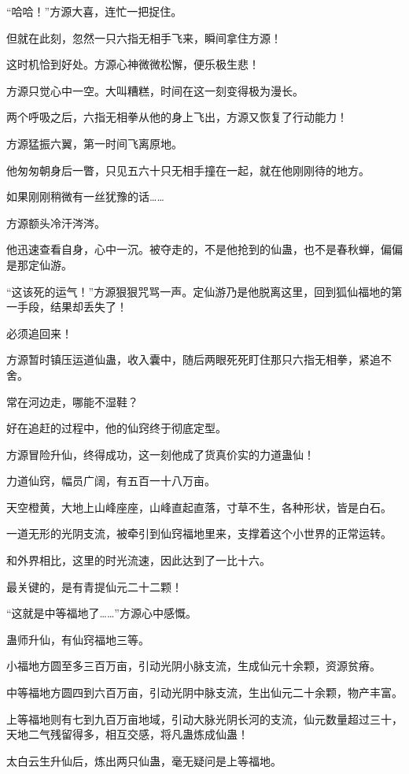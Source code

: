 \begin{this_body}
“哈哈！”方源大喜，连忙一把捉住。

但就在此刻，忽然一只六指无相手飞来，瞬间拿住方源！

这时机恰到好处。方源心神微微松懈，便乐极生悲！

方源只觉心中一空。大叫糟糕，时间在这一刻变得极为漫长。

两个呼吸之后，六指无相拳从他的身上飞出，方源又恢复了行动能力！

方源猛振六翼，第一时间飞离原地。

他匆匆朝身后一瞥，只见五六十只无相手撞在一起，就在他刚刚待的地方。

如果刚刚稍微有一丝犹豫的话……

方源额头冷汗涔涔。

他迅速查看自身，心中一沉。被夺走的，不是他抢到的仙蛊，也不是春秋蝉，偏偏是那定仙游。

“这该死的运气！”方源狠狠咒骂一声。定仙游乃是他脱离这里，回到狐仙福地的第一手段，结果却丢失了！

必须追回来！

方源暂时镇压运道仙蛊，收入囊中，随后两眼死死盯住那只六指无相拳，紧追不舍。

常在河边走，哪能不湿鞋？

好在追赶的过程中，他的仙窍终于彻底定型。

方源冒险升仙，终得成功，这一刻他成了货真价实的力道蛊仙！

力道仙窍，幅员广阔，有五百一十八万亩。

天空橙黄，大地上山峰座座，山峰直起直落，寸草不生，各种形状，皆是白石。

一道无形的光阴支流，被牵引到仙窍福地里来，支撑着这个小世界的正常运转。

和外界相比，这里的时光流速，因此达到了一比十六。

最关键的，是有青提仙元二十二颗！

“这就是中等福地了……”方源心中感慨。

蛊师升仙，有仙窍福地三等。

小福地方圆至多三百万亩，引动光阴小脉支流，生成仙元十余颗，资源贫瘠。

中等福地方圆四到六百万亩，引动光阴中脉支流，生出仙元二十余颗，物产丰富。

上等福地则有七到九百万亩地域，引动大脉光阴长河的支流，仙元数量超过三十，天地二气残留得多，相互交感，将凡蛊炼成仙蛊！

太白云生升仙后，炼出两只仙蛊，毫无疑问是上等福地。


\end{this_body}
